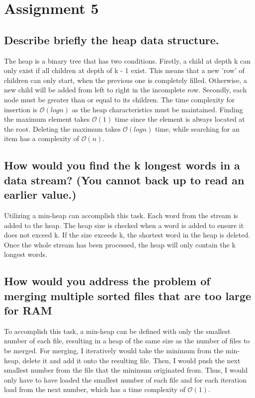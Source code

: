 \documentclass[runningheads]{llncs}
\begin{document}
\section*{Assignment 5}

\subsection*{Describe briefly the heap data structure.}
The heap is a binary tree that has two conditions. Firstly, a child at depth k can only exist if all children at depth of k - 1 exist.
This means that a new 'row' of children can only start, when the previous one is completely filled. Otherwise, a new child will be added from
left to right in the incomplete row. Secondly, each node must be greater than or equal to its children. The time complexity for insertion is
$\mathcal{O}(log n)$ as the heap characteristics must be maintained. Finding the maximum element takes $\mathcal{O}(1)$ time since the element
is always located at the root. Deleting the maximum takes $\mathcal{O}(log n)$ time, while searching for an item has a complexity of
$\mathcal{O}(n)$.

\subsection*{How would you find the k longest words in a data stream? (You cannot back up to read an earlier value.)}
Utilizing a min-heap can accomplish this task. Each word from the stream is added to the heap. The heap size is checked when a word is added to
ensure it does not exceed k. If the size exceeds k, the shortest word in the heap is deleted. Once the whole stream has been processed, the heap
will only contain the k longest words.

\subsection*{How would you address the problem of merging multiple sorted files that are too large for RAM}
To accomplish this task, a min-heap can be defined with only the smallest number of each file, resulting in a heap of the same size as the
number of files to be merged. For merging, I iteratively would take the minimum from the min-heap, delete it and add it onto the resulting file.
Then, I would push the next smallest number from the file that the minimum originated from. Thus, I would only have to have loaded the smallest number
of each file and for each iteration load from the next number, which has a time complexity of $\mathcal{O}(1)$.
\end{document}
